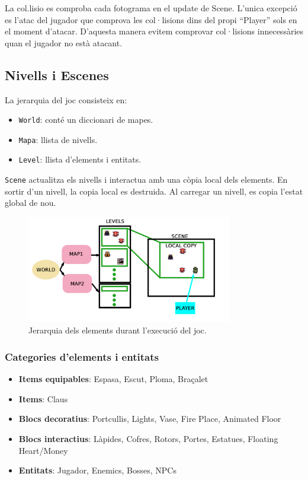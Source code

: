 \documentclass[a4paper,12pt]{article}
\begin{document}
La col.lisio es comproba cada fotograma en el update de Scene. L'unica excepció es l'atac del jugador que comprova les col·lisions dins del propi ``Player'' sols en el moment d'atacar. D'aquesta manera evitem comprovar col·lisions innecessàries quan el jugador no està atacant.

\subsection{Nivells i Escenes}
La jerarquia del joc consisteix en:
\begin{itemize}
    \item \texttt{World}: conté un diccionari de mapes.
    \item \texttt{Mapa}: llista de nivells.
    \item \texttt{Level}: llista d'elements i entitats.
\end{itemize}
\texttt{Scene} actualitza els nivells i interactua amb una còpia local dels elements. En sortir d'un nivell, la copia local es destruida. Al carregar un nivell, es copia l'estat global de nou.

\begin{figure}[ht!]
    \centering
    \includegraphics[width=0.8\textwidth]{../imgs/global_to_local.png}
    \caption{Jerarquia dels elements durant l'execució del joc.}
    \label{fig:global_to_local}
\end{figure}

\subsubsection{Categories d'elements i entitats}
\begin{itemize}
    \item \textbf{Items equipables}: Espasa, Escut, Ploma, Braçalet
    \item \textbf{Items}: Claus
    \item \textbf{Blocs decoratius}: Portcullis, Lights, Vase, Fire Place, Animated Floor
    \item \textbf{Blocs interactius}: Làpides, Cofres, Rotors, Portes, Estatues, Floating Heart/Money
    \item \textbf{Entitats}: Jugador, Enemics, Bosses, NPCs
\end{itemize}
\end{document}
